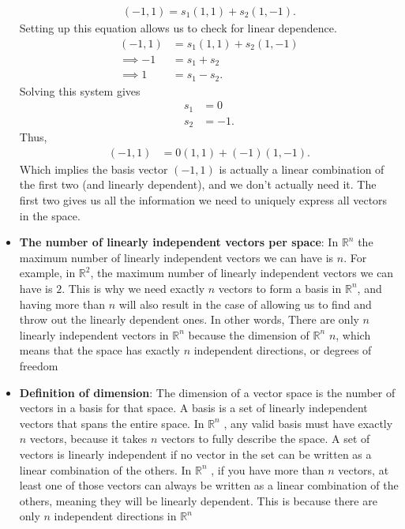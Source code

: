 \documentclass{report}
\begin{document}
\begin{itemize}
            \begin{align*}
                (-1,1) = s_1(1,1) + s_2(1,-1)
            .\end{align*}
            \bigbreak \noindent 
            Setting up this equation allows us to check for linear dependence.
            \begin{align*}
                (-1,1) &= s_1(1,1) + s_2(1,-1) \\
                \implies -1 &= s_1 + s_2 \\
                \implies 1 &= s_1 - s_2
            .\end{align*}
            Solving this system gives 
            \begin{align*}
                s_1 &= 0\\
                s_2 &= -1
            .\end{align*}
            Thus,
            \begin{align*}
                (-1,1) &= 0(1,1) + (-1)(1,-1)
            .\end{align*}
            Which implies the basis vector $(-1,1)$ is actually a linear combination of the first two (and linearly dependent), and we don't actually need it. The first two gives us all the information we need to uniquely express all vectors in the space.
        \item \textbf{The number of linearly independent vectors per space}: In $\mathbb{R}^{n}$ the maximum number of linearly independent vectors we can have is $n$. For example, in $\mathbb{R}^{2}$, the maximum number of linearly independent vectors we can have is $2$. This is why we need exactly $n$ vectors to form a basis in $\mathbb{R}^{n}$, and having more than $n$ will also result in the case of allowing us to find and throw out the linearly dependent ones.
            \bigbreak \noindent 
            In other words, There are only $n$ linearly independent vectors in $\mathbb{R}^{n}$ because the dimension of $\mathbb{R}^{n}$ $n$, which means that the space has exactly $n$ independent directions, or degrees of freedom
        \item \textbf{Definition of dimension}: The dimension of a vector space is the number of vectors in a basis for that space. A basis is a set of linearly independent vectors that spans the entire space. In $\mathbb{R}^{n} $ , any valid basis must have exactly $n$ vectors, because it takes $n$ vectors to fully describe the space.
            \bigbreak \noindent 
            A set of vectors is linearly independent if no vector in the set can be written as a linear combination of the others. In $\mathbb{R}^{n}$ , if you have more than $n$ vectors, at least one of those vectors can always be written as a linear combination of the others, meaning they will be linearly dependent. This is because there are only $n$ independent directions in $\mathbb{R}^{n}$

\end{itemize}
\end{document}
